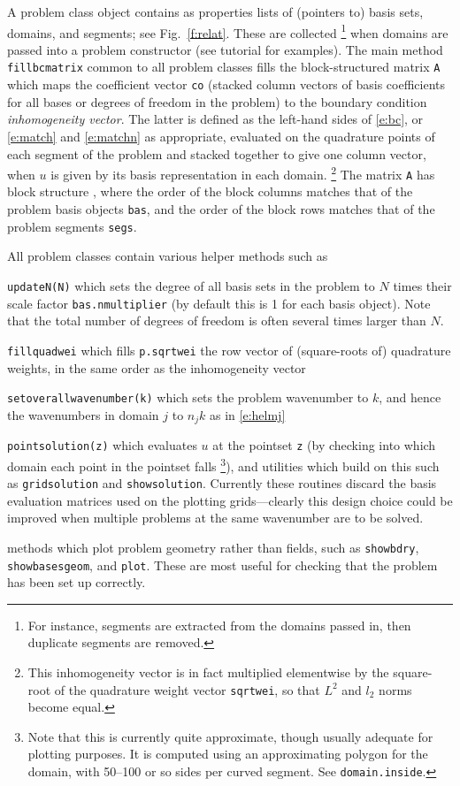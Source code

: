 \documentclass[12pt]{article}
\begin{document}
A problem class object contains as properties lists of (pointers to)
basis sets, domains, and segments; see Fig.~\ref{f:relat}.
These are collected%
  \footnote{For instance, segments are extracted from the domains passed in,
    then duplicate segments are removed.}
when domains are passed into a problem
constructor (see tutorial for examples).
The main method {\tt fillbcmatrix} common to all problem classes
fills the block-structured matrix {\tt A} which maps the
coefficient vector {\tt co} 
(stacked column vectors of basis coefficients for all
bases or degrees of freedom in the problem)
to the boundary condition {\em inhomogeneity vector}.
The latter is defined as the left-hand sides of
\eqref{e:bc}, or \eqref{e:match} and \eqref{e:matchn}
as appropriate, evaluated on the quadrature points
of each segment of the problem
and stacked together to give one column vector,
when $u$ is given by its basis representation in each domain.%
  \footnote{This inhomogeneity vector is in fact multiplied elementwise by the
    square-root of the quadrature weight vector {\tt sqrtwei},
    so that $L^2$ and $l_2$ norms become equal.}
The matrix {\tt A} has block structure \cite{polygonscatt}, where the
order of the block columns matches that of the problem basis
objects {\tt bas}, and the order of the block rows
matches that of the problem segments {\tt segs}.

All problem classes contain various helper methods such as
\bi
\item
{\tt updateN(N)} which sets the degree of all basis sets in the
problem to $N$ times their scale factor {\tt bas.nmultiplier}
(by default this is 1 for each basis object).
Note that the total number of degrees of freedom is often several times
larger than $N$.
\item
{\tt fillquadwei} which fills {\tt p.sqrtwei} the row vector of
(square-roots of)
quadrature weights, in the same order as the inhomogeneity vector
\item {\tt setoverallwavenumber(k)} which sets the problem wavenumber to $k$,
and hence the wavenumbers in domain $j$ to $n_j k$ as in \eqref{e:helmj}
\item {\tt pointsolution(z)} which evaluates $u$ at the pointset {\tt z}
(by checking into which domain each point in the pointset falls%
  \footnote{Note that this is currently quite approximate, though usually
    adequate for plotting purposes. It is computed using an approximating
    polygon for the domain, with 50--100 or so sides per curved segment.
    See {\tt domain.inside}.}),
and utilities which build on this such as {\tt gridsolution} and
{\tt showsolution}. Currently these routines discard the
basis evaluation matrices used on the plotting grids---clearly 
this design choice could be improved when multiple problems at the
same wavenumber are to be solved.
\item methods which plot problem geometry rather than fields, such as
{\tt showbdry}, {\tt showbasesgeom}, and {\tt plot}.
These are most useful for checking that the problem has been set up correctly.
\ei
\end{document}
